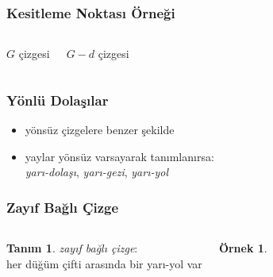 \documentclass[dvipsnames]{beamer}
\theoremstyle{definition}
\newtheorem{tanim}[theorem]{Tanım}
\theoremstyle{example}
\newtheorem{ornek}[theorem]{Örnek}
\theoremstyle{plain}
\begin{document}
\begin{frame}
  \frametitle{Kesitleme Noktası Örneği}

  \begin{columns}
    \begin{block}{$G$ çizgesi}
      \begin{center}
      \end{center}
    \end{block}

    \begin{block}{$G - d$ çizgesi}
      \begin{center}
      \end{center}
    \end{block}
  \end{columns}
\end{frame}

\begin{frame}
  \frametitle{Yönlü Dolaşılar}

  \begin{itemize}
    \item yönsüz çizgelere benzer şekilde

    \pause
    \item yaylar yönsüz varsayarak tanımlanırsa:\\
      \emph{yarı-dolaşı}, \emph{yarı-gezi}, \emph{yarı-yol}
  \end{itemize}
\end{frame}

\begin{frame}
  \frametitle{Zayıf Bağlı Çizge}

  \begin{columns}
    \begin{tanim}
      \emph{zayıf bağlı çizge}:\\
      her düğüm çifti arasında bir yarı-yol var
    \end{tanim}

    \begin{ornek}
      \begin{center}
      \end{center}
    \end{ornek}
  \end{columns}
\end{frame}
\end{document}
